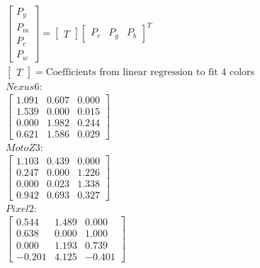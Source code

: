 \begin{subequations}
\begin{align}
	&\begin{bmatrix}
	    P_{y} \\
	    P_{m} \\
	    P_{c} \\
	    P_{w}
	\end{bmatrix}
	=
	\begin{bmatrix}
		T
	\end{bmatrix}
	\begin{bmatrix}
	    P_{r} &
	    P_{g} &
	    P_{b}
	\end{bmatrix}^T
	\\
	&\begin{bmatrix}
		T
	\end{bmatrix}
	=
	\mbox{Coefficients from linear regression to fit 4 colors} \nonumber
	\\
	&Nexus 6: \nonumber
	\\
	&\begin{bmatrix}
	     1.091 &      0.607 &      0.000 \\
	     1.539 &      0.000 &      0.015 \\
	     0.000 &      1.982 &      0.244 \\
	     0.621 &      1.586 &      0.029
	\end{bmatrix}
	\\
	&Moto Z3:  \nonumber
	\\
	&\begin{bmatrix}
	     1.103 &      0.439 &      0.000 \\
	     0.247 &      0.000 &      1.226 \\
	     0.000 &      0.023 &      1.338 \\
	     0.942 &      0.693 &      0.327
	\end{bmatrix}
	\\
	&Pixel 2:  \nonumber
	\\
	&\begin{bmatrix}
	     0.544 &      1.489 &      0.000 \\
	     0.638 &      0.000 &      1.000 \\
	     0.000 &      1.193 &      0.739 \\
	    -0.201 &      4.125 &     -0.401
	\end{bmatrix}
\end{align}
	\label{eq:linear_independent}
\end{subequations}
\fi

